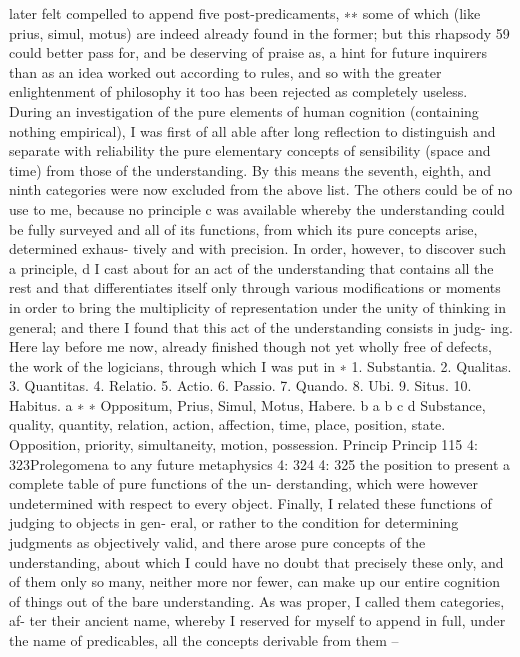 later felt compelled to append ﬁve post-predicaments, ∗∗ some of which
(like prius, simul, motus) are indeed already found in the former; but this
rhapsody 59 could better pass for, and be deserving of praise as, a hint for
future inquirers than as an idea worked out according to rules, and so
with the greater enlightenment of philosophy it too has been rejected as
completely useless.
During an investigation of the pure elements of human cognition
(containing nothing empirical), I was ﬁrst of all able after long reﬂection
to distinguish and separate with reliability the pure elementary concepts
of sensibility (space and time) from those of the understanding. By this
means the seventh, eighth, and ninth categories were now excluded from
the above list. The others could be of no use to me, because no principle c
was available whereby the understanding could be fully surveyed and all
of its functions, from which its pure concepts arise, determined exhaus-
tively and with precision.
In order, however, to discover such a principle, d I cast about for an
act of the understanding that contains all the rest and that differentiates
itself only through various modiﬁcations or moments in order to bring
the multiplicity of representation under the unity of thinking in general;
and there I found that this act of the understanding consists in judg-
ing. Here lay before me now, already ﬁnished though not yet wholly
free of defects, the work of the logicians, through which I was put in
∗
1. Substantia. 2. Qualitas. 3. Quantitas. 4. Relatio. 5. Actio. 6. Passio. 7. Quando.
8. Ubi. 9. Situs. 10. Habitus. a
∗ ∗ Oppositum, Prius, Simul, Motus, Habere. b
a
b
c
d
Substance, quality, quantity, relation, action, affection, time, place, position, state.
Opposition, priority, simultaneity, motion, possession.
Princip
Princip
115
4: 323Prolegomena to any future metaphysics
4: 324
4: 325
the position to present a complete table of pure functions of the un-
derstanding, which were however undetermined with respect to every
object. Finally, I related these functions of judging to objects in gen-
eral, or rather to the condition for determining judgments as objectively
valid, and there arose pure concepts of the understanding, about which I
could have no doubt that precisely these only, and of them only so many,
neither more nor fewer, can make up our entire cognition of things out
of the bare understanding. As was proper, I called them categories, af-
ter their ancient name, whereby I reserved for myself to append in full,
under the name of predicables, all the concepts derivable from them –
